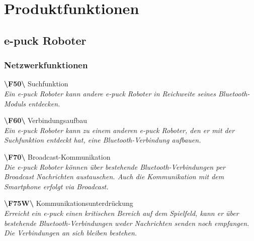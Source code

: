 \documentclass[10pt,a4paper]{article}
\begin{document}
	\section{Produktfunktionen}
		\subsection{e-puck Roboter}
			\subsubsection{Netzwerkfunktionen}
				\begin{list}{}{\leftmargin=1cm}
					\item[\textbf{\textbackslash F50\textbackslash}] Suchfunktion
						\\ \textsl{Ein e-puck Roboter kann andere e-puck Roboter in Reichweite seines Bluetooth-Moduls entdecken.}
					\item[\textbf{\textbackslash F60\textbackslash}] Verbindungsaufbau
						\\ \textsl{Ein e-puck Roboter kann zu einem anderen e-puck Roboter, den er mit der Suchfunktion entdeckt
						hat, eine Bluetooth-Verbindung aufbauen.}
					\item[\textbf{\textbackslash F70\textbackslash}] Broadcast-Kommunikation
						\\ \textsl{Die e-puck Roboter können über bestehende Bluetooth-Verbindungen per Broadcast
						Nachrichten austauschen. Auch die Kommunikation mit dem Smartphone erfolgt via Broadcast.}
					\item[\textbf{\textbackslash F75W\textbackslash}] Kommunikationsunterdrückung
						\\ \textsl{Erreicht ein e-puck einen kritischen Bereich auf dem Spielfeld, kann er über bestehende
						Bluetooth-Verbindungen weder Nachrichten senden noch empfangen. Die Verbindungen an sich bleiben bestehen.}
				\end{list}
\end{document}
